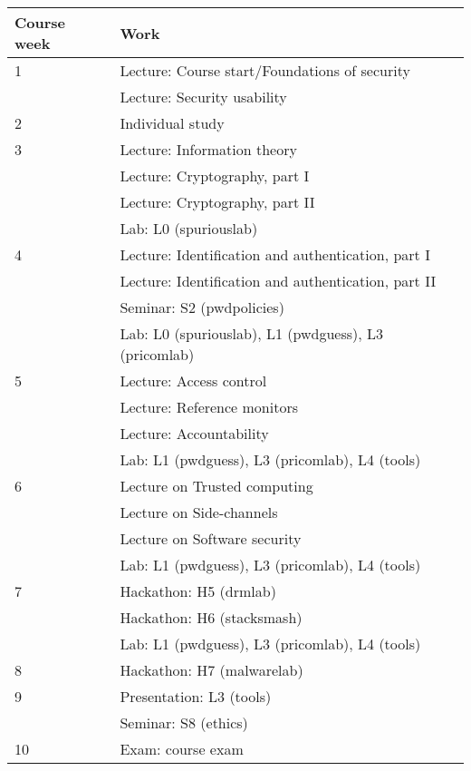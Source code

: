 \begin{table}
	\centering
  \begin{tabular}{lp{9cm}}
    \toprule
    \textbf{Course week}	& \textbf{Work} \\
    \midrule
    1
    & Lecture: Course start/Foundations of security\\
    & Lecture: Security usability\\
    \midrule
    2
    & Individual study\\
    \midrule
    3
    & Lecture: Information theory\\
    & Lecture: Cryptography, part I\\
    & Lecture: Cryptography, part II\\
    & Lab: L0 (spuriouslab)\\
    \midrule
    4
    & Lecture: Identification and authentication, part I\\
    & Lecture: Identification and authentication, part II\\
    & Seminar: S2 (pwdpolicies)\\
    & Lab: L0 (spuriouslab), L1 (pwdguess), L3 (pricomlab)\\
    \midrule
    5
    & Lecture: Access control\\
    & Lecture: Reference monitors\\
    & Lecture: Accountability\\
    & Lab: L1 (pwdguess), L3 (pricomlab), L4 (tools)\\
    \midrule
    6
    & Lecture on Trusted computing\\
    & Lecture on Side-channels\\
    & Lecture on Software security\\
    & Lab: L1 (pwdguess), L3 (pricomlab), L4 (tools)\\
    \midrule
    7
    & Hackathon: H5 (drmlab)\\
    & Hackathon: H6 (stacksmash)\\
    & Lab: L1 (pwdguess), L3 (pricomlab), L4 (tools)\\
    \midrule
    8
    & Hackathon: H7 (malwarelab)\\
    \midrule
    9
    & Presentation: L3 (tools)\\
    & Seminar: S8 (ethics)\\
    \midrule
    10
    & Exam: course exam\\

\end{tabular}
\end{table}
